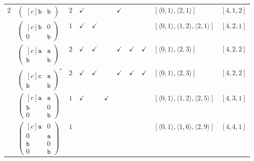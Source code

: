 \documentclass[12pt]{article}
\theoremstyle{definition}
\theoremstyle{plain}
\begin{document}
{\begin{longtable}{@{}cYcccccccZc@{}}
\midrule[\heavyrulewidth]

$2$
& $\begin{pmatrix*}[c]    \mathtt{b}   &  \mathtt{b}    \end{pmatrix*}$
& $2$
& $\checkmark$
&
&
& $\checkmark$
&
&
& $[\langle0,1\rangle,\allowbreak\langle2,1\rangle]$
& $[4,1,2]$
\\

\cmidrule(lr){2-11}

& $\begin{pmatrix*}[c]    \mathtt{b}   &  0  \\   0  &   \mathtt{b}    \end{pmatrix*}$
& $1$
& $\checkmark$
& $\checkmark$
&
&
&
&
& $[\langle0,1\rangle,\allowbreak\langle1,2\rangle,\allowbreak\langle2,1\rangle]$
& $[4,2,1]$
\\

\cmidrule(lr){2-11}

& $\begin{pmatrix*}[c]    \mathtt{a}   &  \mathtt{a}  \\   \mathtt{b}  &   \mathtt{b}    \end{pmatrix*}$
& $2$
& $\checkmark$
& $\checkmark$
&
& $\checkmark$
& $\checkmark$
& $\checkmark$
& $[\langle0,1\rangle,\allowbreak\langle2,3\rangle]$
& $[4,2,2]$
\\

\cmidrule(lr){2-11}

& $\begin{pmatrix*}[c]    \mathtt{c}   &  \mathtt{a}  \\   \mathtt{b}  &   \mathtt{b}    \end{pmatrix*}^*$
& $2$
& $\checkmark$
& $\checkmark$
&
& $\checkmark$
& $\checkmark$
& $\checkmark$
& $[\langle0,1\rangle,\allowbreak\langle2,3\rangle]$
& $[4,2,2]$
\\

\cmidrule(lr){2-11}

& $\begin{pmatrix*}[c]
\mathtt{a}   &  \mathtt{a}  \\
\mathtt{b}  &   0    \\
0  &  \mathtt{b}
\end{pmatrix*}$
& $1$
& $\checkmark$
&
& $\checkmark$
&
&
&
& $[\langle0,1\rangle,\allowbreak\langle1,2\rangle,\allowbreak\langle2,5\rangle]$
& $[4,3,1]$
\\

\cmidrule(lr){2-11}


& $\begin{pmatrix*}[c]
\mathtt{a}   &  0  \\
0  &  \mathtt{a}   \\
\mathtt{b}  &   0    \\
0  &  \mathtt{b}
\end{pmatrix*}$
& $1$
&
&
&
&
&
&
& $[\langle0,1\rangle,\allowbreak\langle1,6\rangle,\allowbreak\langle2,9\rangle]$
& $[4,4,1]$
\\


\end{longtable}}
\end{document}
